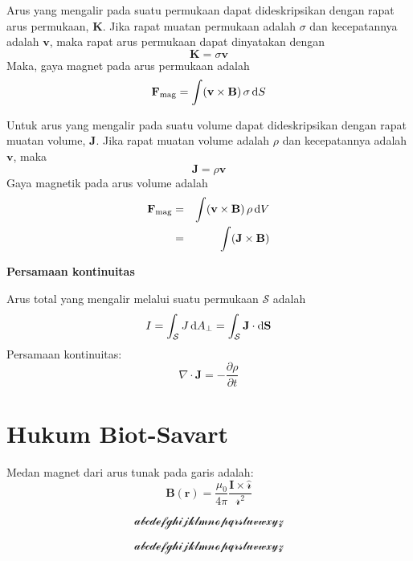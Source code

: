 \documentclass[10pt,english,twocolumn]{extarticle}
\newcommand{\dd}{\textnormal{d}}
\begin{document}
Arus yang mengalir pada suatu permukaan dapat dideskripsikan dengan rapat arus
permukaan, $\mathbf{K}$.
Jika rapat muatan permukaan adalah $\sigma$ dan kecepatannya adalah $\mathbf{v}$, maka
rapat arus permukaan dapat dinyatakan dengan
\begin{equation}
\mathbf{K} = \sigma \mathbf{v}
\end{equation}
Maka, gaya magnet pada arus permukaan adalah
\begin{equation}
\mathbf{F}_{\textnormal{mag}} = \int (\mathbf{v} \times \mathbf{B})\,\sigma\,\dd S
\end{equation}

Untuk arus yang mengalir pada suatu volume dapat dideskripsikan dengan rapat muatan
volume, $\mathbf{J}$. Jika rapat muatan volume adalah $\rho$ dan kecepatannya adalah
$\mathbf{v}$, maka
\begin{equation}
\mathbf{J} = \rho \mathbf{v}
\end{equation}
Gaya magnetik pada arus volume adalah
\begin{eqnarray}
\mathbf{F}_{\textnormal{mag}} & = & \int (\mathbf{v}\times\mathbf{B})\,\rho\,\dd V \\
& = & \int (\mathbf{J}\times\mathbf{B})
\end{eqnarray}

\textbf{Persamaan kontinuitas}

Arus total yang mengalir melalui suatu permukaan $\mathcal{S}$ adalah
\begin{equation}
I = \int_{\mathcal{S}} J\, \dd A_{\bot} = \int_{\mathcal{S}} \mathbf{J} \cdot \dd \mathbf{S}
\end{equation}
Persamaan kontinuitas:
\begin{equation}
\nabla \cdot \mathbf{J} = - \frac{\partial \rho}{\partial t}
\end{equation}

\section{Hukum Biot-Savart}
Medan magnet dari arus tunak pada garis adalah:
\begin{equation}
\mathbf{B}(\mathbf{r}) = \frac{\mu_0}{4\pi} \frac{\mathbf{I}\times\hat{\mathscr{r}}}{\mathscr{r}^2}
\end{equation}

\begin{equation}
\mathcal{abcdefghijklmnopqrstuvwxyz}
\end{equation}

\begin{equation}
\mathscr{abcdefghijklmnopqrstuvwxyz}
\end{equation}
\end{document}
